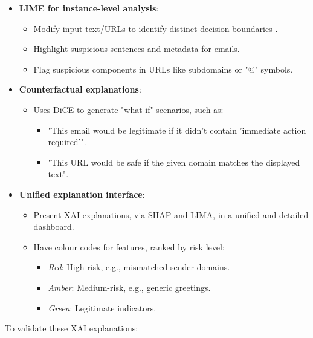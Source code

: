 \begin{itemize}
  \item \textbf{LIME for instance-level analysis}:
  \begin{itemize}
    \item Modify input text/URLs to identify distinct decision boundaries \citep{ribeiro2016model}.
    \item Highlight suspicious sentences and metadata for emails.
    \item Flag suspicious components in URLs like subdomains or "@" symbols.
  \end{itemize}
  \item \textbf{Counterfactual explanations}:
  \begin{itemize}
    \item Uses DiCE to generate "what if" scenarios, such as:
    \begin{itemize}
      \item "This email would be legitimate if it didn't contain 'immediate action required'".
      \item "This URL would be safe if the given domain matches the displayed text".
    \end{itemize}
  \end{itemize}
  \item \textbf{Unified explanation interface}:
  \begin{itemize}
    \item Present XAI explanations, via SHAP and LIMA, in a unified and detailed dashboard.
    \item Have colour codes for features, ranked by risk level: 
    \begin{itemize}
      \item \textit{Red}: High-risk, e.g., mismatched sender domains.
      \item \textit{Amber}: Medium-risk, e.g., generic greetings.
      \item \textit{Green}: Legitimate indicators.
    \end{itemize}
  \end{itemize}
\end{itemize}

\noindent To validate these XAI explanations:

